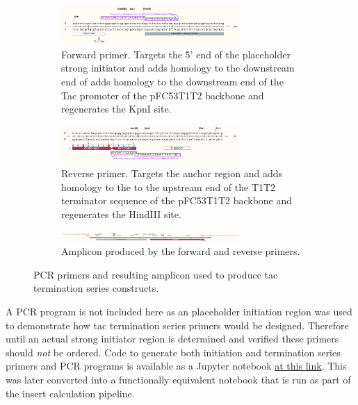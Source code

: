 \documentclass[11pt]{article}
\begin{document}
\begin{figure}[H]
	\centering
	\begin{subfigure}[b]{\textwidth}
		\centering
		\includegraphics[width=0.75\textwidth]{images/primers/t7-term-forward.png}
		\caption{Forward primer. Targets the 5' end of the placeholder strong initiator and adds homology to the downstream end of adds homology to the downstream end of the Tac promoter of the pFC53T1T2 backbone and regenerates the KpnI site.}
		\label{fig:y equals x}
	\end{subfigure}
	\vfill
	\begin{subfigure}[b]{\textwidth}
		\centering
		\includegraphics[width=0.75\textwidth]{images/primers/t7-term-reverse.png}
		\caption{Reverse primer. Targets the anchor region and adds homology to the to the upstream end of the T1T2 terminator sequence of the pFC53T1T2 backbone and regenerates the HindIII site.}
		\label{fig:three sin x}
	\end{subfigure}
	\vfill
	\begin{subfigure}[b]{\textwidth}
		\centering
		\includegraphics[width=0.75\textwidth]{images/primers/t7-term-amplicon.png}
		\caption{Amplicon produced by the forward and reverse primers.}
		\label{fig:three sin x}
	\end{subfigure}
	\caption{PCR primers and resulting amplicon used to produce tac termination series constructs.}
\end{figure}


A PCR program is not included here as an placeholder initiation region was used to demonstrate how tac termination series primers would be designed. Therefore until an actual strong initiator region is determined and verified these primers should \emph{not} be ordered. Code to generate both initiation and termination series primers and PCR programs is available as a Jupyter notebook \href{https://github.com/EthanHolleman/plasmid-VR-design/blob/main/notes/tac_series_primers.ipynb}{at this link}. This was later converted into a functionally equivalent notebook that is run as part of the insert calculation pipeline. 
\end{document}
